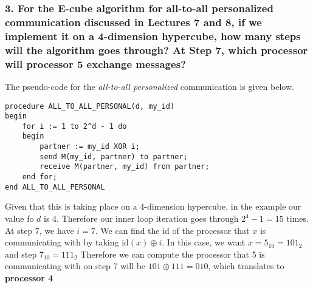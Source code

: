 \documentclass[titlepage]{article}
\begin{document}
\subsubsection*{3. For the E-cube algorithm for all-to-all personalized 
communication discussed in Lectures 7 and 8, if we implement it on a 
4-dimension hypercube, how many steps will the algorithm goes through? At Step
7, which processor will processor 5 exchange messages?}
The pseudo-code for the \textit{all-to-all personalized} communication is given
below.
\begin{verbatim}
procedure ALL_TO_ALL_PERSONAL(d, my_id)
begin
    for i := 1 to 2^d - 1 do
    begin
        partner := my_id XOR i;
        send M(my_id, partner) to partner;
        receive M(partner, my_id) from partner;
    end for;
end ALL_TO_ALL_PERSONAL
\end{verbatim}
Given that this is taking place on a 4-dimension hypercube, in the example our
value fo $d$ is 4. Therefore our inner loop iteration goes through 
$2^4 - 1 = 15$ times. At step 7, we have $i=7$. We can find the id of the
processor that $x$ is communicating with by taking $\textrm{id}(x) \oplus i$.
In this case, we want $x= 5_{10} = 101_2$ and step $7_{10} = 111_2$ Therefore
we can compute the processor that 5 is communicating with on step 7 will be
$101 \oplus 111 = 010$, which translates to \textbf{processor 4}
\end{document}
